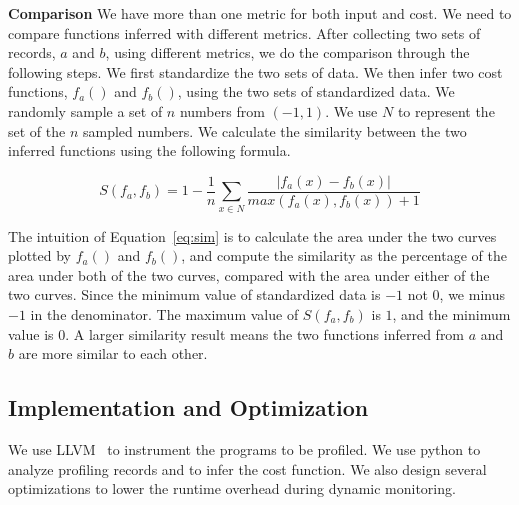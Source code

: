 \noindent\textbf{Comparison}
We have more than one metric for both input and cost.
We need to compare functions inferred with different metrics. 
After collecting two sets of records, $a$ and $b$, using different metrics, 
we do the comparison through the following steps. 
We first standardize the two sets of data. 
We then infer two cost functions, $f_a()$ and $f_b()$, 
using the two sets of standardized data.
We randomly sample a set of $n$ numbers from $(-1, 1)$.
We use $N$ to represent the set of the $n$ sampled numbers.  
We calculate the similarity between the two inferred 
functions using the following formula. 



\begin{equation} \label{eq:sim}
S(f_a, f_b) = 1 - \frac{1}{n}\sum_{x \in N}\frac{|f_a(x) - f_b(x)|}{max(f_a(x),f_b(x))+1}
\end{equation}

The intuition of Equation~\ref{eq:sim} is to calculate the area under the two curves 
plotted by $f_a()$ and $f_b()$, 
and compute the similarity as the percentage of the area under both of the two curves, 
compared with the area under either of the two curves.
Since the minimum value of standardized data is $-1$ not $0$,
we minus $-1$ in the denominator.
The maximum value of $S(f_a, f_b)$ is $1$, and the minimum value is $0$.
A larger similarity result means the two functions inferred 
from $a$ and $b$ are more similar to each other. 



\subsection{Implementation and Optimization}

We use LLVM~\cite{llvm} to instrument the programs to be profiled.
We use python to analyze profiling records 
and to infer the cost function. 
We also design several optimizations to lower the runtime overhead 
during dynamic monitoring.  

